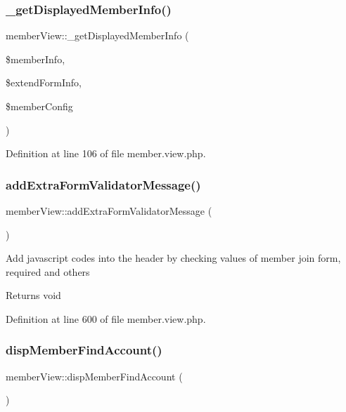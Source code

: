\subsubsection{\texorpdfstring{\+\_\+get\+Displayed\+Member\+Info()}{\_getDisplayedMemberInfo()}}
{\footnotesize\ttfamily member\+View\+::\+\_\+get\+Displayed\+Member\+Info (\begin{DoxyParamCaption}\item[{}]{\$member\+Info,  }\item[{}]{\$extend\+Form\+Info,  }\item[{}]{\$member\+Config }\end{DoxyParamCaption})}



Definition at line 106 of file member.\+view.\+php.

\hypertarget{classmemberView_a7500578f8585e5875626ea613763d22b}{}\label{classmemberView_a7500578f8585e5875626ea613763d22b} 
\subsubsection{\texorpdfstring{add\+Extra\+Form\+Validator\+Message()}{addExtraFormValidatorMessage()}}
{\footnotesize\ttfamily member\+View\+::add\+Extra\+Form\+Validator\+Message (\begin{DoxyParamCaption}{ }\end{DoxyParamCaption})}

Add javascript codes into the header by checking values of member join form, required and others \begin{DoxyReturn}{Returns}
void 
\end{DoxyReturn}


Definition at line 600 of file member.\+view.\+php.

\hypertarget{classmemberView_aa211f5cf6e3a62c3a24c22d75954f9c9}{}\label{classmemberView_aa211f5cf6e3a62c3a24c22d75954f9c9} 
\subsubsection{\texorpdfstring{disp\+Member\+Find\+Account()}{dispMemberFindAccount()}}
{\footnotesize\ttfamily member\+View\+::disp\+Member\+Find\+Account (\begin{DoxyParamCaption}{ }\end{DoxyParamCaption})}



